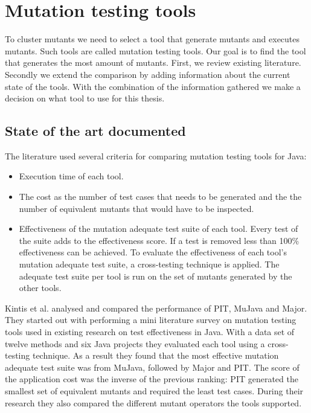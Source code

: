 \documentclass[../main]{subfiles}
\begin{document}
\chapter{Mutation testing tools}
\label{ch:mutation-tool}
To cluster mutants we need to select a tool that generate mutants and executes mutants.
Such tools are called mutation testing tools.
Our goal is to find the tool that generates the most amount of mutants. 
\newline
First, we review existing literature. 
Secondly we extend the comparison by adding information about the current state of the tools.
With the combination of the information gathered we make a decision on what tool to use for this thesis.

\section{State of the art documented}
\label{ch:tooling-literature}
The literature used several criteria for comparing mutation testing tools for Java:
\begin{itemize}
  \item Execution time of each tool.
  \item The cost as the number of test cases that needs to be generated and the the number of equivalent mutants that would have to be inspected.
  \item Effectiveness of the mutation adequate test suite of each tool. Every test of the suite adds to the effectiveness score. If a test is removed less than 100\% effectiveness can be achieved. To evaluate the effectiveness of each tool's mutation adequate test suite, a cross-testing technique is applied. The adequate test suite per tool is run on the set of mutants generated by the other tools.
\end{itemize}
Kintis et al. analysed and compared the performance of PIT,  MuJava and Major\cite{Kintis2016AnalysingStudy}. 
They started out with performing a mini literature survey on mutation testing tools used in existing research on test effectiveness in Java. 
With a data set of twelve methods and six Java projects they evaluated each tool using a cross-testing technique.
As a result they found that the most effective mutation adequate test suite was from MuJava, followed by Major and PIT.
The score of the application cost was the inverse of the previous ranking: PIT generated the smallest set of equivalent mutants and required the least test cases.
During their research they also compared the different mutant operators the tools supported. 
\end{document}
